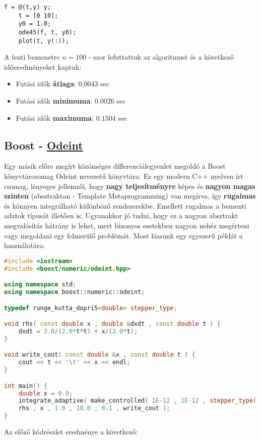 \begin{lstlisting}[caption={Matlab példakód diff. egyenlet megoldására.}, captionpos=b]
	f = @(t,y) y;
	t = [0 10];
	y0 = 1.0;
	ode45(f, t, y0);
	plot(t, y(:));
\end{lstlisting}


A fenti bemenetre $ n = 100 $ - szor lefuttattuk az algoritmust és a következő időeredményeket kaptuk:
\begin{itemize}
	\item Futási idők \textbf{átlaga}: $ 0.0043 $ sec
	\item Futási idők \textbf{minimuma}: $ 0.0026 $ sec
	\item Futási idők \textbf{maximuma}: $ 0.1504 $ sec
\end{itemize}




\begin{center}
\end{center}

\subsection {Boost - \href{http://headmyshoulder.github.io/odeint-v2/}{Odeint}} \label{BoostOdeint}

Egy másik előre megírt közönséges differenciálegyenlet megoldó a Boost könyvtárcsomag Odeint nevezetű könyvtára. Ez egy modern C++ nyelven írt csomag, lényeges jellemzői, hogy \textbf{nagy teljesítményre} képes és \textbf{nagyon magas szinten} (absztraktan - Template Metaprogramming) van megírva, így \textbf{rugalmas} és könnyen integrálható különböző rendszerekbe. Emellett rugalmas a bementi adatok típusát illetően is. Ugyanakkor jó tudni, hogy ez a nagyon absztrakt megvalósítás hátrány is lehet, mert bizonyos esetekben nagyon nehéz megérteni vagy megoldani egy felmerülő problémát. Most lássunk egy egyszerű példát a használatára:

\begin{lstlisting}[caption={Odeint példakód.}, captionpos=b, language = C++]
#include <iostream>
#include <boost/numeric/odeint.hpp>

using namespace std;
using namespace boost::numeric::odeint;

typedef runge_kutta_dopri5<double> stepper_type;

void rhs( const double x , double &dxdt , const double t ) {
	dxdt = 3.0/(2.0*t*t) + x/(2.0*t);
}

void write_cout( const double &x , const double t ) {
	cout << t << '\t' << x << endl;
}

int main() {
	double x = 0.0;    
	integrate_adaptive( make_controlled( 1E-12 , 1E-12 , stepper_type() ) ,
	rhs , x , 1.0 , 10.0 , 0.1 , write_cout );
}
\end{lstlisting}
\pagebreak
Az előző kódrészlet eredménye a következő:



